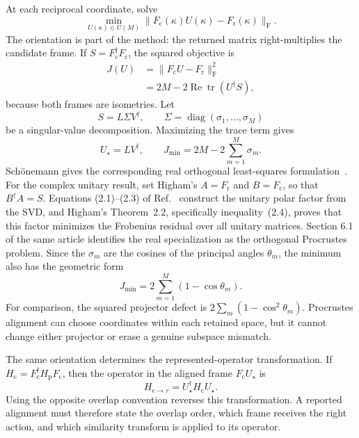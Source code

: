 At each reciprocal coordinate, solve
\begin{equation}
  \min_{U(\kappa)\in U(M)}
  \lVert F_{\mathrm c}(\kappa)U(\kappa)
          -F_{\mathrm r}(\kappa)\rVert_{\mathrm F}.
  \label{eq:training-composite-pointwise-procrustes}
\end{equation}
The orientation is part of the method: the returned matrix right-multiplies the
candidate frame. If $S=F_{\mathrm c}^{\dagger}F_{\mathrm r}$, the squared
objective is
\begin{align}
  J(U)
  &=\lVert F_{\mathrm c}U-F_{\mathrm r}\rVert_{\mathrm F}^2 \\
  &=2M-2\operatorname{Re}\operatorname{tr}(U^{\dagger}S),
  \label{eq:training-composite-procrustes-expansion}
\end{align}
because both frames are isometries. Let
\begin{equation}
  S=L\Sigma V^{\dagger},
  \qquad
  \Sigma=\operatorname{diag}(\sigma_1,\ldots,\sigma_M)
  \label{eq:training-composite-procrustes-svd}
\end{equation}
be a singular-value decomposition. Maximizing the trace term gives
\begin{equation}
  U_{\star}=LV^{\dagger},
  \qquad
  J_{\min}=2M-2\sum_{m=1}^{M}\sigma_m.
  \label{eq:training-composite-pointwise-solution}
\end{equation}
Sch\"onemann gives the corresponding real orthogonal least-squares
formulation~\cite{schonemann1966}. For the complex unitary result, set Higham's
$A=F_{\mathrm r}$ and $B=F_{\mathrm c}$, so that $B^{\dagger}A=S$. Equations
(2.1)--(2.3) of Ref.~\cite{higham1986} construct the unitary polar factor from
the SVD, and Higham's Theorem~2.2, specifically inequality~(2.4), proves that
this factor minimizes the Frobenius residual over all unitary matrices. Section
6.1 of the same article identifies the real specialization as the orthogonal
Procrustes problem. Since the $\sigma_m$ are the cosines of the principal
angles $\theta_m$, the minimum also has the geometric form
\begin{equation}
  J_{\min}=2\sum_{m=1}^{M}(1-\cos\theta_m).
  \label{eq:training-composite-procrustes-principal-angle-residual}
\end{equation}
For comparison, the squared projector defect is
$2\sum_m(1-\cos^2\theta_m)$. Procrustes alignment can choose coordinates within
each retained space, but it cannot change either projector or erase a genuine
subspace mismatch.

The same orientation determines the represented-operator transformation. If
$H_{\mathrm c}=F_{\mathrm c}^{\dagger}H_{\mathrm p}F_{\mathrm c}$, then the
operator in the aligned frame $F_{\mathrm c}U_{\star}$ is
\begin{equation}
  H_{\mathrm c\rightarrow r}
  =U_{\star}^{\dagger}H_{\mathrm c}U_{\star}.
  \label{eq:training-composite-procrustes-operator-map}
\end{equation}
Using the opposite overlap convention reverses this transformation. A reported
alignment must therefore state the overlap order, which frame receives the
right action, and which similarity transform is applied to its operator.

